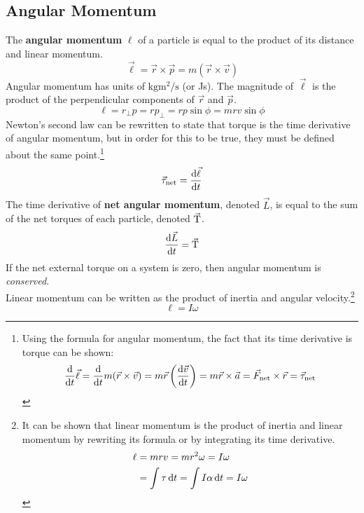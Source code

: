 \documentclass[../AP_Physics_C.tex]{subfiles}
\begin{document}
		\subsection{Angular Momentum}
			The \textbf{angular momentum} $\pmb{\ell}$ of a particle is equal to the product of its distance and linear momentum.
			\[\vec{\ell} = \vec{r} \times \vec{p} = m(\vec{r} \times \vec{v})\]
			Angular momentum has units of $\mathrm{kgm^2/s}$ (or Js).
			The magnitude of $\vec{\ell}$ is the product of the perpendicular components of $\vec{r}$ and $\vec{p}$.
			\[\ell = r_\bot p = rp_\bot = rp\sin\phi = mrv\sin\phi\]
			Newton's second law can be rewritten to state that torque is the time derivative of angular momentum, but in order for this to be true, they must be defined about the same point.\footnote{
				Using the formula for angular momentum, the fact that its time derivative is torque can be shown:
				\[\frac{\mathrm{d}}{\mathrm{d} t}\vec{\ell} = \frac{\mathrm{d}}{\mathrm{d} t}m(\vec{r}\times\vec{v}) = m\vec{r}\left(\frac{\mathrm{d}\vec{v}}{\mathrm{d} t}\right) = m\vec{r}\times \vec{a} = \vec{F}_{\operatorname{net}}\times\vec{r} = \vec{\tau}_{\operatorname{net}}\]
			}
			\[\vec{\tau}_{\operatorname{net}} = \frac{\mathrm{d} \vec{\ell}}{\mathrm{d} t}\]
			The time derivative of \textbf{net angular momentum}, denoted $\vec{L}$, is equal to the sum of the net torques of each particle, denoted $\vec{\operatorname{T}}$.
			\[\frac{\mathrm{d}\vec{L}}{\mathrm{d} t} = \vec{\operatorname{T}}\]
			If the net external torque on a system is zero, then angular momentum is \emph{conserved}. \\
			Linear momentum can be written as the product of inertia and angular velocity.\footnote{It can be shown that linear momentum is the product of inertia and linear momentum by rewriting its formula or by integrating its time derivative.\begin{align*}\ell &= mrv = mr^2\omega = I\omega \\ &= \int \tau\,\mathrm{d} t = \int I\alpha\,\mathrm{d} t = I\omega\end{align*}}
			\[\ell = I\omega\]
\end{document}
